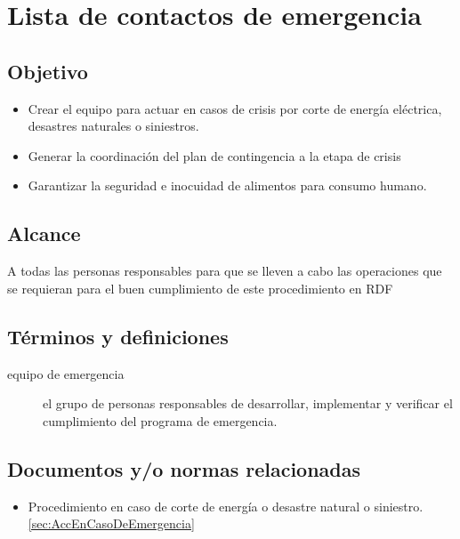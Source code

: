 \thispagestyle{formato-PI}
\renewcommand{\MayorVer}{2}
\renewcommand{\MenorVer}{0}
\renewcommand{\FechaPub}{2023--01}
\renewcommand{\TipoID}{L}
\renewcommand{\Titulo}{Lista de contactos de emergencia}

\section{\Titulo}
\renewcommand{\Codigo}{\Prog--\thesection--\TipoID}

\subsection{Objetivo}
\begin{itemize}
	\item Crear el equipo para actuar en casos de crisis por corte de energía eléctrica, desastres naturales o siniestros.
	\item Generar la coordinación del plan de contingencia a la etapa de crisis
	\item Garantizar la seguridad e inocuidad de alimentos para consumo humano.
\end{itemize}

\subsection{Alcance}
A todas las personas responsables para que se lleven a cabo las operaciones que se requieran para el buen cumplimiento de este procedimiento en \gls{RDF}

\subsection{Términos y definiciones}

\begin{description}
	\item[equipo de emergencia] el grupo de personas responsables de desarrollar, implementar y verificar el cumplimiento del programa de emergencia.
\end{description}

\subsection{Documentos y/o normas relacionadas}
\begin{itemize}
	\item Procedimiento en caso de corte de energía o desastre natural o siniestro. \cref{sec:AccEnCasoDeEmergencia}
\end{itemize}

